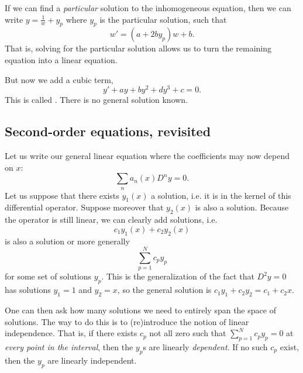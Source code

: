 If we can find a \emph{particular} solution to the inhomogeneous equation, then we can write $y=\frac{1}{w} + y_p$ where $y_p$ is the particular solution, such that
\begin{equation}
    w'=(a+ 2b y_p) w+b.
\end{equation}
That is, solving for the particular solution allows us to turn the remaining equation into a linear equation.

But now we add a cubic term,
\begin{equation}
    y' + ay + by^2 + dy^3 + c=0.
\end{equation}
This is called . There is no general solution known.

\subsection*{Second-order equations, revisited}
Let us write our general linear equation where the coefficients may now depend on $x$:
\begin{equation}
    \sum_n a_n(x) D^n y =0.
\end{equation}
Let us suppose that there exists $y_1(x)$ a solution, i.e. it is in the kernel of this differential operator. Suppose moreover that $y_2(x)$ is also a solution. Because the operator is still linear, we can clearly add solutions, i.e.
\begin{equation}
     c_1 y_1(x) + c_2 y_2(x)
\end{equation}
is also a solution or more generally
\begin{equation}
    \sum_{p=1}^N c_p y_p
\end{equation}
for some set of solutions $y_p$. This is the generalization of the fact that $D^2y=0$ has solutions $y_1=1$ and $y_2=x$, so the general solution is $c_1 y_1 + c_2 y_2 = c_1 + c_2x$.

One can then ask how many solutions we need to entirely span the space of solutions. The way to do this is to (re)introduce the notion of linear independence. That is, if there exists $c_p$ not all zero such that $\sum_{p=1}^N c_p y_p=0$ at \emph{every point in the interval}, then the $y_p$s are linearly \emph{dependent}. If no such $c_p$ exist, then the $y_p$ are linearly independent.

